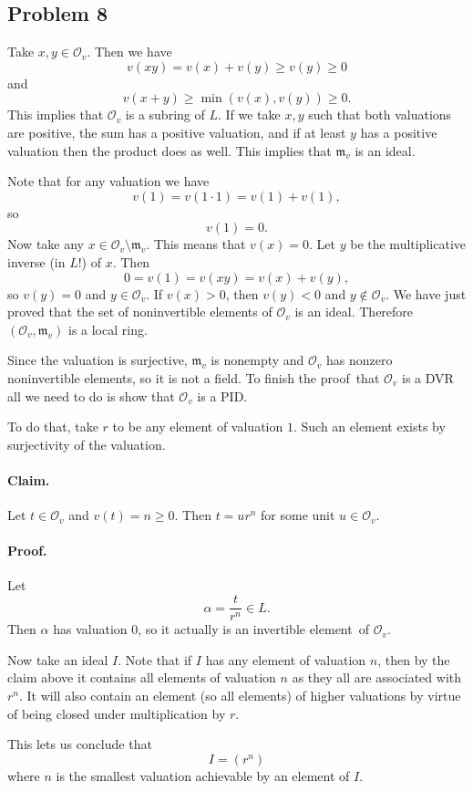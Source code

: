 \subsection*{Problem 8}

Take \( x, y \in \mathcal{O}_v \). Then we have
\[ 
v(xy) = v(x) + v(y) \geqslant v(y) \geqslant 0
\]
and
\[ 
    v(x + y) \geqslant \min (v(x), v(y)) \geqslant 0. 
\]
This implies that \( \mathcal{O}_v \) is a subring of \( L \).
If we take \( x,y \) such that both valuations are positive, the sum has
a positive valuation, and if at least \( y \) has a positive valuation
then the product does as well. This implies that \( \mathfrak{m}_v \) is an ideal.

Note that for any valuation we have
\[ 
    v(1) = v(1 \cdot 1) = v(1) + v(1), 
\]
so
\[ 
    v(1) = 0. 
\]
Now take any \( x \in \mathcal{O}_v \setminus \mathfrak{m}_v \). This means
that \( v(x) = 0 \). Let \( y \) be the multiplicative inverse (in \( L \)!)
of \( x \). Then
\[ 
    0 = v(1) = v(xy) = v(x) + v(y), 
\]
so \( v(y) = 0\) and \( y \in \mathcal{O}_v \). If \( v(x) > 0 \), then \( v(y) < 0\)
and \( y \not\in \mathcal{O}_v \). We have just proved that the set of noninvertible
elements of \( \mathcal{O}_v \) is an ideal. Therefore \( (\mathcal{O}_v, \mathfrak{m}_v) \)
is a local ring.

Since the valuation is surjective, \( \mathfrak{m}_v \) is nonempty and \( \mathcal{O}_v \) has
nonzero noninvertible elements, so it is not a field. To finish the proof~that
\( \mathcal{O}_v \) is a DVR all we need to do is show that \( \mathcal{O}_v \) is a PID.

To do that, take \( r \) to be any element of valuation \( 1 \). Such an element
exists by surjectivity of the valuation.

\paragraph{Claim.} Let \( t \in \mathcal{O}_v \) and \( v(t) = n \geqslant 0 \).
Then \( t = ur^n \) for some unit \( u \in \mathcal{O}_v \).

\paragraph{Proof.} Let
\[ 
    \alpha = \frac{t}{r^n} \in L. 
\]
Then \( \alpha \) has valuation \( 0 \), so it actually is an invertible
element~of \( \mathcal{O}_v \).


Now take an ideal \( I \). Note that if \( I \) has any element of valuation \( n \),
then by the claim above it contains all elements of valuation \( n \) as they all are
associated with \( r^n \). It will also contain an element (so all elements) of higher
valuations by virtue of being closed under multiplication by \( r \).

This lets us conclude that 
\[ 
    I = (r^n) 
\]
where \( n \) is the smallest valuation achievable by an element of \( I \).
